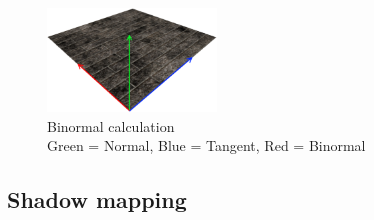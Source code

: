 \documentclass[a4paper]{article}
\begin{document}
\begin{figure}[h!]
  \centering
  \includegraphics[width=0.4\textwidth]{graphics/binormal_calc.eps}
  \caption{Binormal calculation \\
           Green = Normal, Blue = Tangent, Red = Binormal}
  \label{fig:binormal_calc}
\end{figure}
\FloatBarrier

\subsection{Shadow mapping}
\end{document}
